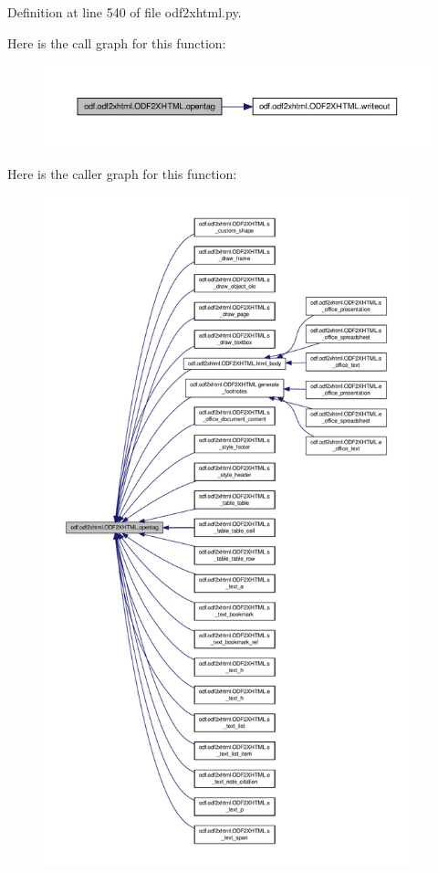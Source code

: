 Definition at line 540 of file odf2xhtml.\+py.



Here is the call graph for this function\+:
\nopagebreak
\begin{figure}[H]
\begin{center}
\leavevmode
\includegraphics[width=350pt]{classodf_1_1odf2xhtml_1_1ODF2XHTML_aa87e53377636cd62d4adab9c67c6f08a_cgraph}
\end{center}
\end{figure}




Here is the caller graph for this function\+:
\nopagebreak
\begin{figure}[H]
\begin{center}
\leavevmode
\includegraphics[height=550pt]{classodf_1_1odf2xhtml_1_1ODF2XHTML_aa87e53377636cd62d4adab9c67c6f08a_icgraph}
\end{center}
\end{figure}


